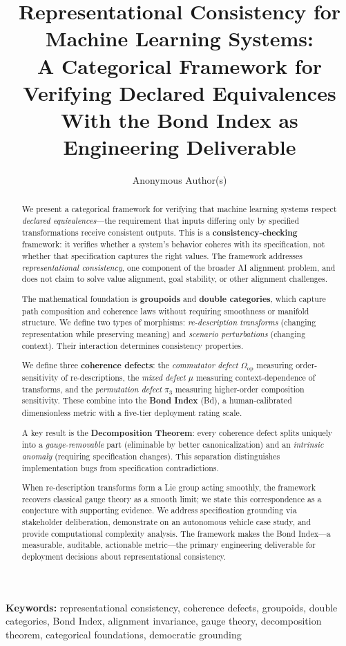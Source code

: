 \documentclass[12pt]{article}
\title{Representational Consistency for Machine Learning Systems:\\
A Categorical Framework for Verifying Declared Equivalences\\
With the Bond Index as Engineering Deliverable}
\author{Anonymous Author(s)}
\date{}
\begin{document}
\maketitle

\noindent\textbf{Keywords:} representational consistency, coherence defects, groupoids, double categories, Bond Index, alignment invariance, gauge theory, decomposition theorem, categorical foundations, democratic grounding

\begin{abstract}
We present a categorical framework for verifying that machine learning systems respect \emph{declared equivalences}---the requirement that inputs differing only by specified transformations receive consistent outputs. This is a \textbf{consistency-checking} framework: it verifies whether a system's behavior coheres with its specification, not whether that specification captures the right values. The framework addresses \emph{representational consistency}, one component of the broader AI alignment problem, and does not claim to solve value alignment, goal stability, or other alignment challenges.

The mathematical foundation is \textbf{groupoids} and \textbf{double categories}, which capture path composition and coherence laws without requiring smoothness or manifold structure. We define two types of morphisms: \emph{re-description transforms} (changing representation while preserving meaning) and \emph{scenario perturbations} (changing context). Their interaction determines consistency properties.

We define three \textbf{coherence defects}: the \emph{commutator defect} $\Omega_{\mathrm{op}}$ measuring order-sensitivity of re-descriptions, the \emph{mixed defect} $\mu$ measuring context-dependence of transforms, and the \emph{permutation defect} $\pi_3$ measuring higher-order composition sensitivity. These combine into the \textbf{Bond Index} (Bd), a human-calibrated dimensionless metric with a five-tier deployment rating scale.

A key result is the \textbf{Decomposition Theorem}: every coherence defect splits uniquely into a \emph{gauge-removable} part (eliminable by better canonicalization) and an \emph{intrinsic anomaly} (requiring specification changes). This separation distinguishes implementation bugs from specification contradictions.

When re-description transforms form a Lie group acting smoothly, the framework recovers classical gauge theory as a smooth limit; we state this correspondence as a conjecture with supporting evidence. We address specification grounding via stakeholder deliberation, demonstrate on an autonomous vehicle case study, and provide computational complexity analysis. The framework makes the Bond Index---a measurable, auditable, actionable metric---the primary engineering deliverable for deployment decisions about representational consistency.
\end{abstract}
\end{document}

